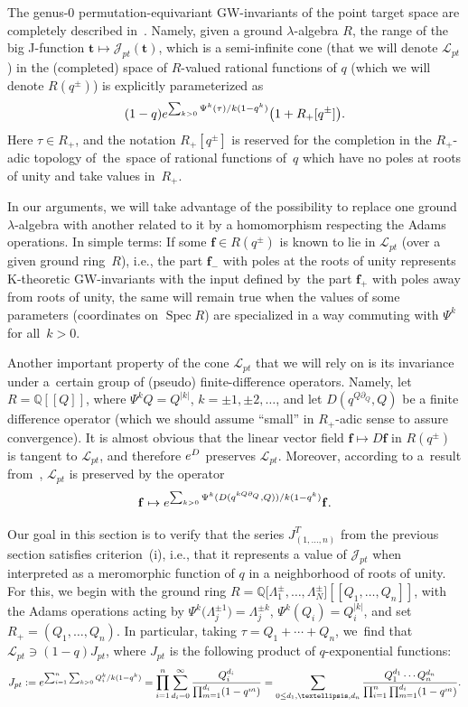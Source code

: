 \documentclass[11pt]{article}
\numberwithin{equation}{section}
\numberwithin{equation}{section}
\def\J{\mathcal J}
\def\L{\mathcal L}
\def\QQ{\mathbb Q}
\def\p{\partial}
\def\f{{\mathbf f}}
\def\t{{\mathbf t}}
\begin{document}
The genus-$0$ permutation-equivariant GW-invariants of the point target space are completely described in~\cite{Givental:perm3}. Namely, given a ground $\lambda$-algebra $R$, the range of the big J-function
$\t\mapsto \J_{pt}(\t)$, which is a semi-infinite cone (that we will denote $\L_{pt}$) in the (completed) space of $R$-valued rational functions of $q$ (which we will denote $R(q^{\pm})$) is explicitly parameterized as
\[
(1-q) {\rm e}^{ \sum_{k>0}\Psi^k(\tau)/k(1-q^k)}\big(1+R_{+}[q^{\pm}]\big).
\]
Here $\tau\in R_{+}$, and the notation $R_{+}[q^{\pm}]$ is reserved for the completion in the $R_{+}$-adic topology of~the~space of rational functions of~$q$ which have no poles at roots of unity and take values in~$R_{+}$.

In our arguments, we will take advantage of the possibility to replace one ground $\lambda$-algebra with another related to it by a homomorphism respecting the Adams operations. In simple terms: If some
$\f\in R(q^{\pm})$ is known to lie in $\L_{pt}$ (over a given ground ring~$R$), i.e., the part $\f_{-}$ with poles at the roots of unity represents K-theoretic GW-invariants with the input defined by~the part $\f_{+}$ with poles away from roots of unity, the same will remain true when the values of some parameters (coordinates on $\operatorname{Spec} R$) are specialized in a way commuting with $\Psi^k$ for all~$k>0$.

Another important property of the cone $\L_{pt}$ that we will rely on is its invariance under a~cer\-tain group of (pseudo) finite-difference operators. Namely, let $R=\QQ[[Q]]$, where $\Psi^kQ=Q^{|k|}$, $k=\pm 1,\pm 2,\dots$, and let $D(q^{Q\p_Q},Q)$ be a finite difference operator (which we should assume ``small'' in $R_{+}$-adic sense to assure convergence). It is almost obvious that the linear vector field $\f \mapsto D\f$ in $R(q^{\pm})$ is tangent to $\L_{pt}$, and therefore ${\rm e}^D$ preserves $\L_{pt}$. Moreover, according to a~result from~\cite{Givental:perm4}, $\L_{pt}$ is preserved by the operator
\[
\f\mapsto {\rm e}^{ \sum_{k>0} \Psi^k(D(q^{kQ\p_Q},Q))/k(1-q^k)} \f.
\]

Our goal in this section is to verify that the series $J^T_{(1,\dots,n)}$ from the previous section satis\-fies criterion~(i), i.e., that it represents a value of $\J_{pt}$ when interpreted as a meromorphic function of $q$ in a neighborhood of roots of unity. For this, we begin with the ground ring $R=\QQ\big[\Lambda_1^{\pm},\dots,\Lambda_N^{\pm}\big][[Q_1,\dots,Q_n]]$, with the Adams operations acting by $\Psi^k\big(\Lambda_j^{\pm 1}\big)=\Lambda_j^{\pm k}$, $\Psi^k(Q_i)=Q_i^{|k|}$, and set $R_{+}=(Q_1,\dots,Q_n)$. In particular, taking $\tau=Q_1+\cdots+Q_n$, we~find that $\L_{pt}\ni (1-q) J_{pt}$, where $J_{pt}$ is the following product of $q$-exponential functions:
\begin{gather*}
J_{pt}:= {\rm e}^{\sum_{i=1}^n\sum_{k>0}Q_i^k/k(1-q^k)}
= \prod_{i=1}^n \sum_{d_i=0}^{\infty}\frac{Q_i^{d_i}}{\prod_{m=1}^{d_i}(1-q^m)}
 = \sum_{0\leq d_1,\dots,d_n}\frac{Q_1^{d_1}\cdots Q_n^{d_n}}{\prod_{i=1}^n\prod_{m=1}^{d_i}(1-q^m)}.
 \end{gather*}
\end{document}
